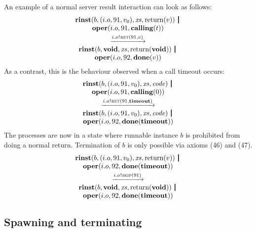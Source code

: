 \documentclass[10pt,conference]{IEEEtran}
\begin{document}
An example of a normal server result interaction can look as follows:
$$
\begin{array}{c}
  {\Trinst b {\Tclient {i.o} {91} {v_0}} \Xs {\Treturn v}} \,\Opar  \\
  {\Toper {i.o} {91} {\Tcalling t}} \vspace{0.6ex} \\
  \red{\say{i.o}{\Tret {91} v}} \\
  {\Trinst b \Tvoid \Xs {\Treturn \Tvoid}} \,\Opar \\
  {\Toper {i.o} {92} {\Tdone v}}
\end{array}
$$
As a contrast, this is the behaviour observed when a call timeout occurs:
$$
\begin{array}{c}
  {\Trinst b {\Tclient {i.o} {91} {v_0}} \Xs \Code} \,\Opar  \\
  {\Toper {i.o} {91} {\Tcalling 0}} \vspace{0.6ex} \\
  \red{\say{i.o}{\Tret {91} \Ttimeout}} \\
  {\Trinst b {\Tclient {i.o} {91} {v_0}} \Xs \Code} \,\Opar  \\
  {\Toper {i.o} {92} {\Tdone \Ttimeout}}
\end{array}
$$
The processes are now in a state where runnable instance $b$ is prohibited from doing a normal return. Termination of $b$ is only possible via axioms (46) and (47).
$$
\begin{array}{c}
  {\Trinst b {\Tclient {i.o} {91} {v_0}} \Xs {\Treturn v}} \,\Opar  \\
  {\Toper {i.o} {92} {\Tdone \Ttimeout}} \vspace{0.6ex} \\
  \red{\say{i.o}{\Tskip {91}}} \\
  {\Trinst b \Tvoid \Xs {\Treturn \Tvoid}} \,\Opar \\
  {\Toper {i.o} {92} {\Tdone \Ttimeout}}
\end{array}
$$


\subsection{Spawning and terminating} \label{sect:SpawnTerm}
\end{document}
